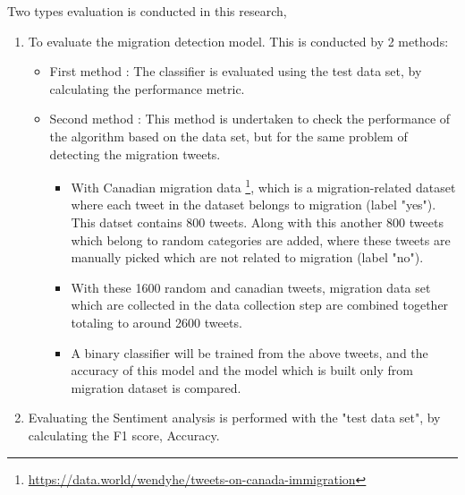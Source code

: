 Two types evaluation is conducted in this research,
\begin{enumerate}
    \item To evaluate the migration detection model. This is conducted by 2 methods:
    \begin{itemize}
        \item First method : 
        The classifier is evaluated using the test data set, by calculating the performance metric.
        \item Second method :
         This method is undertaken to check the performance of the algorithm based on the data set, but for the same problem of detecting the migration tweets.
        \begin{itemize}
       
            \item With Canadian migration data \footnote{\url{https://data.world/wendyhe/tweets-on-canada-immigration}}, which is a migration-related dataset where each tweet in the dataset belongs to migration (label "yes"). This datset contains 800 tweets. Along
            with this another 800 tweets which belong to random categories are added, where these tweets are manually picked which are not related to migration (label "no"). 
            \item With these 1600 random and canadian tweets, migration data set which are collected in the data collection step are combined together totaling to around 2600 tweets.
            \item A binary classifier will be trained from the above tweets, and the accuracy of this model and the model which is built only from migration dataset is compared.
        \end{itemize}
        
    \end{itemize}


    \item Evaluating the Sentiment analysis is performed with the "test data set",
by calculating the F1 score, Accuracy.
\end{enumerate}